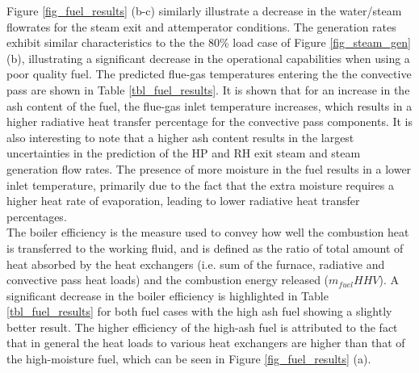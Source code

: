 \documentclass[a4paper,fleqn]{cas-sc}
\begin{document}
Figure \ref{fig_fuel_results} (b-c) similarly illustrate a decrease in the water/steam flowrates for the steam exit and attemperator conditions. The generation rates exhibit similar characteristics to the the 80\% load case of Figure \ref{fig_steam_gen} (b), illustrating a significant decrease in the operational capabilities when using a poor quality fuel. The predicted flue-gas temperatures entering the the convective pass are shown in Table \ref{tbl_fuel_results}. It is shown that for an increase in the ash content of the fuel, the flue-gas inlet temperature increases, which results in a higher radiative heat transfer percentage for the convective pass components. It is also interesting to note that a higher ash content results in the largest uncertainties in the prediction of the HP and RH exit steam and steam generation flow rates. The presence of more moisture in the fuel results in a lower inlet temperature, primarily due to the fact that the extra moisture requires a higher heat rate of evaporation, leading to lower radiative heat transfer percentages.\\

The boiler efficiency is the measure used to convey how well the combustion heat is transferred to the working fluid, and is defined as the ratio of total amount of heat absorbed by the heat exchangers (i.e. sum of the furnace, radiative and convective pass heat loads) and the combustion energy released ($m_{fuel}HHV$). A significant decrease in the boiler efficiency is highlighted in Table \ref{tbl_fuel_results} for both fuel cases with the high ash fuel showing a slightly better result. The higher efficiency of the high-ash fuel is attributed to the fact that in general the heat loads to various heat exchangers are higher than that of the high-moisture fuel, which can be seen in Figure \ref{fig_fuel_results} (a). 
\end{document}
